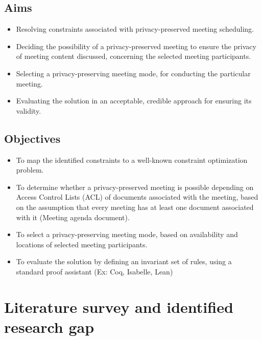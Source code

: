\begin{spacing}{1.0}
    \subsection{Aims}
    \begin{itemize}
        \item Resolving constraints associated with privacy-preserved meeting scheduling.
        \item Deciding the possibility of a privacy-preserved meeting to ensure the privacy of meeting content discussed, concerning the selected meeting participants.
        \item Selecting a privacy-preserving meeting mode, for conducting the particular meeting.
        \item Evaluating the solution in an acceptable, credible approach for ensuring its validity.
    \end{itemize}

    \subsection{Objectives}
    \begin{itemize}
        \item To map the identified constraints to a well-known constraint optimization problem.
        \item To determine whether a privacy-preserved meeting is possible depending on Access Control Lists (ACL) of documents associated with the meeting, based on the assumption that every meeting has at least one document associated with it (Meeting agenda document).
        \item To select a privacy-preserving meeting mode, based on availability and locations of selected meeting participants. 
        \item To evaluate the solution by defining an invariant set of rules, using a standard proof assistant (Ex: Coq, Isabelle, Lean)
    \end{itemize}




    \section{Literature survey and identified research gap}

\end{spacing}
